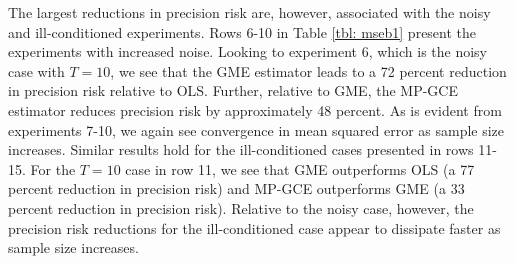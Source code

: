 \documentclass{elsarticle}
\begin{document}
\footnotesize
{}
\normalsize

The largest reductions in precision risk are, however, associated with the noisy
and ill-conditioned experiments.
Rows 6-10 in Table \ref{tbl: mseb1} present the experiments with increased 
noise. 
Looking to experiment 6, which is the noisy case with $T=10$, we see that 
the GME estimator leads to a 72 percent reduction in precision risk relative 
to OLS.
Further, relative to GME, the MP-GCE estimator reduces precision risk by 
approximately 48 percent. 
As is evident from experiments 7-10, we again see convergence in mean 
squared error as sample size increases.
Similar results hold for the ill-conditioned cases presented in rows 11-15.
For the $T=10$ case in row 11, we see that GME outperforms OLS 
(a 77 percent reduction in precision risk) and MP-GCE outperforms GME 
(a 33 percent reduction in precision risk).
Relative to the noisy case, however, the precision risk reductions for the 
ill-conditioned case appear to dissipate faster as sample size increases.
\end{document}
